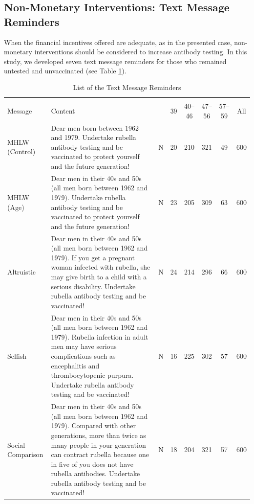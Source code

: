 \documentclass[
      12pt,
    a4paper
]{article}
\begin{document}
\hypertarget{intervention}{%
\subsection{Non-Monetary Interventions: Text Message Reminders}\label{intervention}}

When the financial incentives offered are adequate, as in the presented case, non-monetary interventions should be considered to increase antibody testing. In this study, we developed seven text message reminders for those who remained untested and unvaccinated (see Table \ref{tab:message-list}).

\begin{table}

\caption{\label{tab:message-list}List of the Text Message Reminders}
\centering
\fontsize{9}{11}\selectfont
\begin{threeparttable}
\begin{tabular}[t]{l>{\raggedright\arraybackslash}p{20em}cccccc}
\toprule
\multicolumn{3}{c}{ } & \multicolumn{4}{c}{Age (as of April 2019)} & \multicolumn{1}{c}{ } \\
\cmidrule(l{3pt}r{3pt}){4-7}
Message & Content &   & 39 & 40--46 & 47--56 & 57--59 & All\\
\midrule
MHLW (Control) & Dear men born between 1962 and 1979. Undertake rubella antibody testing and be vaccinated to protect yourself and the future generation! & N & 20 & 210 & 321 & 49 & 600\\
\addlinespace
MHLW (Age) & Dear men in their 40s and 50s (all men born between 1962 and 1979). Undertake rubella antibody testing and be vaccinated to protect yourself and the future generation! & N & 23 & 205 & 309 & 63 & 600\\
\addlinespace
Altruistic & Dear men in their 40s and 50s (all men born between 1962 and 1979). If you get a pregnant woman infected with rubella, she may give birth to a child with a serious disability. Undertake rubella antibody testing and be vaccinated! & N & 24 & 214 & 296 & 66 & 600\\
\addlinespace
Selfish & Dear men in their 40s and 50s (all men born between 1962 and 1979). Rubella infection in adult men may have serious complications such as encephalitis and thrombocytopenic purpura. Undertake rubella antibody testing and be vaccinated! & N & 16 & 225 & 302 & 57 & 600\\
\addlinespace
Social Comparison & Dear men in their 40s and 50s (all men born between 1962 and 1979). Compared with other generations, more than twice as many people in your generation can contract rubella because one in five of you does not have rubella antibodies. Undertake rubella antibody testing and be vaccinated! & N & 18 & 204 & 321 & 57 & 600\\

\end{tabular}
\end{threeparttable}
\end{table}
\end{document}
